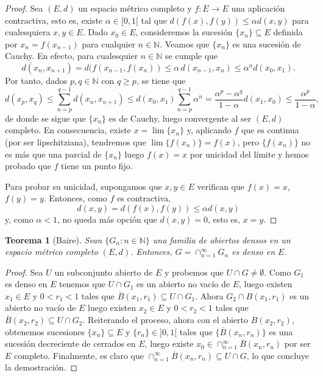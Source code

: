 \documentclass[a4paper,10pt]{article}
\theoremstyle{teorema}
\newtheorem{teor}{Teorema}[section]
\theoremstyle{plano}
\theoremstyle{titulo}
\begin{document}
\begin{proof}
Sea $(E,d)$ un espacio métrico completo y $f:E\rightarrow E$ una
aplicación contractiva, esto es, existe $\alpha\in[0,1[$ tal que
$d(f(x),f(y))\leq \alpha d(x,y)$ para cualesquiera $x,y\in E$. Dado
$x_0\in E$, consideremos la sucesión $\{x_n\}\subseteq E$ definida por
$x_n=f(x_{n-1})$ para cualquier $n\in\mathbb{N}$. Veamos que $\{x_n\}$ es una
sucesión de Cauchy. En efecto, para cualesquier $n\in\mathbb{N}$ se cumple que
\[d(x_n,x_{n+1})=d(f(x_{n-1},f(x_n))\leq\alpha\, d(x_{n-1},x_n)\leq\alpha^n d(x_0,x_1).\]
Por tanto, dados $p,q\in\mathbb{N}$ con $q\geq p$, se tiene que
\[d(x_p,x_q)\leq\sum_{n=p}^{q-1}d(x_n,x_{n+1})\leq
d(x_0,x_1)\sum_{n=p}^{q-1}\alpha^n=\frac{\alpha^p-\alpha^q}{1-\alpha}d(x_1,x_0)\leq\frac{\alpha^p}{1-\alpha},\]
de donde se sigue que $\{x_n\}$ es de Cauchy, luego convergente al ser
$(E,d)$ completo. En consecuencia, existe $x=\lim\{x_n\}$ y, aplicando $f$
que es continua (por ser lipschitziana), tendremos que $\lim\{f(x_n)\}=f(x)$,
pero $\{f(x_n)\}$ no es más que una parcial de $\{x_n\}$ luego $f(x)=x$
por unicidad del límite y hemos probado que $f$ tiene un punto fijo.

Para probar su unicidad, supongamos que $x,y\in E$ verifican que $f(x)=x$,
$f(y)=y$. Entonces, como $f$ es contractiva,
\begin{equation} \label{eq:contractiva}
    d(x,y)=d(f(x),f(y))\leq\alpha d(x,y)
\end{equation}
y, como $\alpha<1$, no queda más opción que $d(x,y)=0$, esto es, $x=y$.
\end{proof}


\begin{teor}[Baire] \label{thm:baire}
Sean $\{G_n:n\in\mathbb{N}\}$ una familia de abiertos densos en un espacio métrico completo $(E,d)$. Entonces, $G=\cap_{n=1}^\infty G_n$ es denso en $E$.
\end{teor}


\begin{proof}
Sea $U$ un subconjunto abierto de $E$ y probemos que $U\cap G\neq\emptyset$. Como $G_1$ es denso en $E$ tenemos que $U\cap G_1$ es un abierto no vacío de  $E$, luego existen $x_1\in E$ y $0<r_1<1$ tales que $\overline B(x_1,r_1)\subseteq U\cap G_1$. Ahora $G_2\cap B(x_1,r_1)$ es un abierto no vacío de $E$ luego existen $x_2\in E$ y $0<r_2<1$ tales que $\overline B(x_2,r_2)\subseteq U\cap G_2$. Reiterando el proceso, ahora con el abierto $B(x_2,r_2)$, obtenemos sucesiones $\{x_n\}\subseteq E$ y $\{r_n\}\in]0,1[$ tales que $\{\overline B(x_n,r_n)\}$ es una sucesión decreciente de cerrados en $E$, luego existe $x_0\in\cap_{n=1}^\infty\overline B(x_n,r_n)$ por ser $E$ completo. Finalmente, es claro que $\cap_{n=1}^\infty\overline B(x_n,r_n)\subseteq U\cap G$, lo que concluye la demostración. \end{proof}
\end{document}
